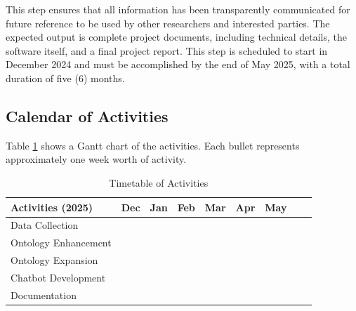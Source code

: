     This step ensures that all information has been transparently communicated for future reference to be used by other researchers and interested parties. The expected output is complete project documents, including technical details, the software itself, and a final project report. This step is scheduled to start in December 2024 and must be accomplished by the end of May 2025, with a total duration of five (6) months.

\subsection{Calendar of Activities}

Table \ref{tab:timetableactivities} shows a Gantt chart of the activities.  Each bullet represents approximately
one week worth of activity.

%
%
\newcommand{\weekone}{\textbullet}
\newcommand{\weektwo}{\textbullet \textbullet}
\newcommand{\weekthree}{\textbullet \textbullet \textbullet}
\newcommand{\weekfour}{\textbullet \textbullet \textbullet \textbullet}

%
%

\begin{table}[ht]   %
\centering
\caption{Timetable of Activities} \vspace{0.25em}
\begin{tabular}{|p{2in}|c|c|c|c|c|c|c|c|} \hline
\centering Activities (2025)            & Dec & Jan   & Feb & Mar & Apr & May \\ \hline
Data Collection                         & \weekfour  & \weektwo ~~~ &  &  &  & \\ \hline
Ontology Enhancement                    & ~~~\weektwo  & \weektwo ~~~ & & & & \\ \hline
Ontology Expansion                      & & ~~~\weektwo & \weekfour & \weekfour & \weekfour & \\ \hline
Chatbot Development                     & & & \weekfour & \weekfour & \weekfour & \weekfour \\ \hline
Documentation                           & \weekfour  & \weekfour & \weekfour & \weekfour & \weekfour & \weekfour \\ \hline


\end{tabular}
\label{tab:timetableactivities}
\end{table}

